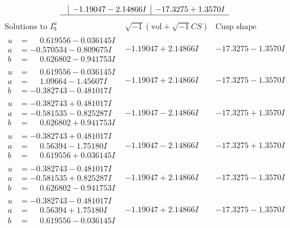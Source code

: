 \documentclass[1p]{elsarticle_modified}
\theoremstyle{definition}
\newcommand{\I}{\sqrt{-1}}
\begin{document}
$$\begin{array}{c|c|c}
 & -1.19047 - 2.14866 I & -17.3275 + 1.3570 I\\
 \hline 
 \end{array}$$\newpage$$\begin{array}{c|c|c}  
\text{Solutions to }I^u_{9}& \I (\text{vol} + \sqrt{-1}CS) & \text{Cusp shape}\\
 \hline 
\begin{aligned}
u &= \phantom{-}0.619556 - 0.036145 I \\
a &= -0.570534 - 0.809675 I \\
b &= \phantom{-}0.626802 - 0.941753 I\end{aligned}
 & -1.19047 + 2.14866 I & -17.3275 - 1.3570 I \\ \hline\begin{aligned}
u &= \phantom{-}0.619556 - 0.036145 I \\
a &= \phantom{-}1.09664 - 1.45607 I \\
b &= -0.382743 - 0.481017 I\end{aligned}
 & -1.19047 + 2.14866 I & -17.3275 - 1.3570 I \\ \hline\begin{aligned}
u &= -0.382743 + 0.481017 I \\
a &= -0.581535 - 0.825287 I \\
b &= \phantom{-}0.626802 + 0.941753 I\end{aligned}
 & -1.19047 - 2.14866 I & -17.3275 + 1.3570 I \\ \hline\begin{aligned}
u &= -0.382743 + 0.481017 I \\
a &= \phantom{-}0.56394 - 1.75180 I \\
b &= \phantom{-}0.619556 + 0.036145 I\end{aligned}
 & -1.19047 - 2.14866 I & -17.3275 + 1.3570 I \\ \hline\begin{aligned}
u &= -0.382743 - 0.481017 I \\
a &= -0.581535 + 0.825287 I \\
b &= \phantom{-}0.626802 - 0.941753 I\end{aligned}
 & -1.19047 + 2.14866 I & -17.3275 - 1.3570 I \\ \hline\begin{aligned}
u &= -0.382743 - 0.481017 I \\
a &= \phantom{-}0.56394 + 1.75180 I \\
b &= \phantom{-}0.619556 - 0.036145 I\end{aligned}
 & -1.19047 + 2.14866 I & -17.3275 - 1.3570 I \\ \hline\begin{aligned}

\end{aligned}
\end{array}$$
\end{document}
